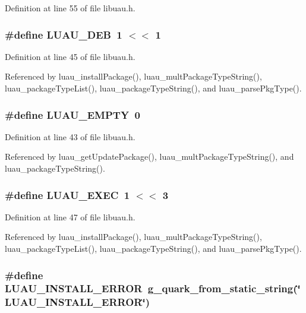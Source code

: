 Definition at line 55 of file libuau.h.
\subsubsection{\setlength{\rightskip}{0pt plus 5cm}\#define LUAU\_\-DEB\ 1 $<$$<$ 1}\label{libuau_8h_a7}




Definition at line 45 of file libuau.h.

Referenced by luau\_\-install\-Package(), luau\_\-mult\-Package\-Type\-String(), luau\_\-package\-Type\-List(), luau\_\-package\-Type\-String(), and luau\_\-parse\-Pkg\-Type().
\subsubsection{\setlength{\rightskip}{0pt plus 5cm}\#define LUAU\_\-EMPTY\ 0}\label{libuau_8h_a5}




Definition at line 43 of file libuau.h.

Referenced by luau\_\-get\-Update\-Package(), luau\_\-mult\-Package\-Type\-String(), and luau\_\-package\-Type\-String().
\subsubsection{\setlength{\rightskip}{0pt plus 5cm}\#define LUAU\_\-EXEC\ 1 $<$$<$ 3}\label{libuau_8h_a9}




Definition at line 47 of file libuau.h.

Referenced by luau\_\-install\-Package(), luau\_\-mult\-Package\-Type\-String(), luau\_\-package\-Type\-List(), luau\_\-package\-Type\-String(), and luau\_\-parse\-Pkg\-Type().
\subsubsection{\setlength{\rightskip}{0pt plus 5cm}\#define LUAU\_\-INSTALL\_\-ERROR\ g\_\-quark\_\-from\_\-static\_\-string(\char`\"{}LUAU\_\-INSTALL\_\-ERROR\char`\"{})}\label{libuau_8h_a15}




